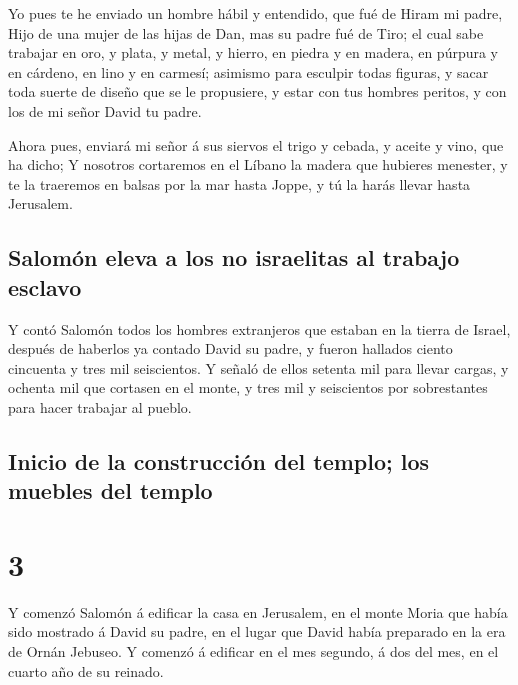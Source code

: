  Yo pues te he enviado un hombre hábil y entendido, que fué
de Hiram mi padre,  Hijo de una mujer de las hijas de Dan,
mas su padre fué de Tiro; el cual sabe trabajar en oro, y plata, y
metal, y hierro, en piedra y en madera, en púrpura y en cárdeno, en lino
y en carmesí; asimismo para esculpir todas figuras, y sacar toda suerte
de diseño que se le propusiere, y estar con tus hombres peritos, y con
los de mi señor David tu padre.

 Ahora pues, enviará mi señor á sus siervos el trigo y
cebada, y aceite y vino, que ha dicho;  Y nosotros
cortaremos en el Líbano la madera que hubieres menester, y te la
traeremos en balsas por la mar hasta Joppe, y tú la harás llevar hasta
Jerusalem.

\hypertarget{salomuxf3n-eleva-a-los-no-israelitas-al-trabajo-esclavo}{%
\subsection{Salomón eleva a los no israelitas al trabajo
esclavo}\label{salomuxf3n-eleva-a-los-no-israelitas-al-trabajo-esclavo}}

 Y contó Salomón todos los hombres extranjeros que estaban
en la tierra de Israel, después de haberlos ya contado David su padre, y
fueron hallados ciento cincuenta y tres mil seiscientos.  Y
señaló de ellos setenta mil para llevar cargas, y ochenta mil que
cortasen en el monte, y tres mil y seiscientos por sobrestantes para
hacer trabajar al pueblo.

\hypertarget{inicio-de-la-construcciuxf3n-del-templo-los-muebles-del-templo}{%
\subsection{Inicio de la construcción del templo; los muebles del
templo}\label{inicio-de-la-construcciuxf3n-del-templo-los-muebles-del-templo}}

\hypertarget{section-2}{%
\section{3}\label{section-2}}

 Y comenzó Salomón á edificar la casa en Jerusalem, en el
monte Moria que había sido mostrado á David su padre, en el lugar que
David había preparado en la era de Ornán Jebuseo.  Y comenzó
á edificar en el mes segundo, á dos del mes, en el cuarto año de su
reinado.

